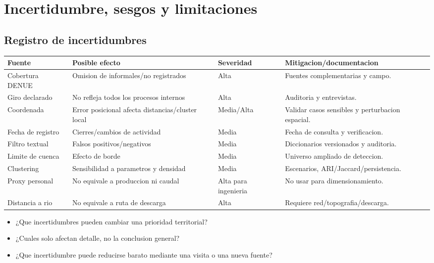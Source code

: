 \documentclass[11pt,letterpaper]{article}
\begin{document}
\section{Incertidumbre, sesgos y limitaciones}

\subsection{Registro de incertidumbres}
\begin{longtable}{p{}p{}p{}p{}}
\toprule
\textbf{Fuente} & \textbf{Posible efecto} & \textbf{Severidad} & \textbf{Mitigacion/documentacion} \\
\midrule
Cobertura DENUE & Omision de informales/no registrados & Alta & Fuentes complementarias y campo. \\
Giro declarado & No refleja todos los procesos internos & Alta & Auditoria y entrevistas. \\
Coordenada & Error posicional afecta distancias/cluster local & Media/Alta & Validar casos sensibles y perturbacion espacial. \\
Fecha de registro & Cierres/cambios de actividad & Media & Fecha de consulta y verificacion. \\
Filtro textual & Falsos positivos/negativos & Media & Diccionarios versionados y auditoria. \\
Limite de cuenca & Efecto de borde & Media & Universo ampliado de deteccion. \\
Clustering & Sensibilidad a parametros y densidad & Media & Escenarios, ARI/Jaccard/persistencia. \\
Proxy personal & No equivale a produccion ni caudal & Alta para ingenieria & No usar para dimensionamiento. \\
Distancia a rio & No equivale a ruta de descarga & Alta & Requiere red/topografia/descarga. \\
\bottomrule
\end{longtable}

\begin{preguntas}
\begin{itemize}
    \item ¿Que incertidumbres pueden cambiar una prioridad territorial?
    \item ¿Cuales solo afectan detalle, no la conclusion general?
    \item ¿Que incertidumbre puede reducirse barato mediante una visita o una nueva fuente?
\end{itemize}
\end{preguntas}
\end{document}
